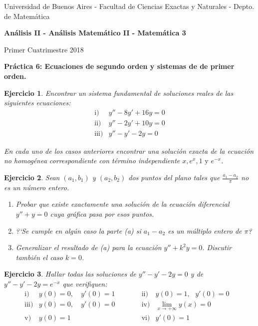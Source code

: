 \documentclass[11pt,a4paper,pdftex]{amsart}
\newtheorem{ej}{Ejercicio}%
\numberwithin{equation}{section}%
\newcommand{\bej}[1]{\begin{ej}\rm{#1}}
\newcommand{\eej}{\end{ej}\vspace{-0.2cm}}
\renewcommand{\bf}{\textbf}
\newcommand{\0}{\mathbb O}
\newcommand{\8}{\infty}
\begin{document}

\centerline{{\small Universidad de Buenos Aires - Facultad de Ciencias Exactas y Naturales - Depto. de Matemática}}

 \vskip 0.2cm
 \hrulefill
 \vskip 0.2cm

 \centerline{{\bf{\Large{\sc Análisis II - Análisis Matemático II - Matemática 3}}}}
 \vskip 0.2cm
 \centerline{\ttfamily Primer Cuatrimestre 2018}
 \hrulefill

 \medskip
 \centerline{\bf {Práctica 6: Ecuaciones de segundo orden y sistemas de de primer orden.}}
 \medskip

\setcounter{equation}{0}



\bej  Encontrar un sistema fundamental de soluciones reales de las siguientes
ecuaciones:
\[
\begin{array}{ll}
\mbox{i)}&y''-8y'+16y=0\\
\mbox{ii)}&y''-2y'+10y=0\\
\mbox{iii)}&y''-y'-2y=0
\end{array}
\]

 En cada uno de los casos anteriores encontrar una soluci\'on exacta
de la ecuaci\'on no homog\'enea correspondiente con t\'ermino
independiente $x, e^x,1 \mbox{ y } e^{-x}$.

\eej

\bej Sean $(a_{1},b_{1})$ y $(a_{2},b_{2})$ dos puntos del plano tales que
$\frac{a_{1}-a_{2}}{\pi}$ no es un n\'umero entero.
\begin{enumerate}
\item Probar que existe exactamente una soluci\'on de la ecuaci\'on
diferencial $y''+y=0$ cuya gr\'afica pasa por esos puntos.

\item ?`Se cumple en alg\'un caso la parte (a) si $a_{1}-a_{2}$ es un m\'ultiplo
entero de $\pi$?

\item Generalizar el resultado de (a) para la ecuaci\'on $y''+k^{2}y=0$. Discutir
tambi\'en el caso $k=0$.
\end{enumerate}
\eej

\bej Hallar todas las soluciones de $y''-y'-2y=0$ y de $y''-y'-2y= e^{-x}$
que verifiquen:
\[
\begin{array}{llllll}
\mbox{i)} &y(0)=0,\ &y'(0)=1\qquad\quad&\mbox{ii)}&y(0)=1,\ \ \ y'(0)=0\\
\mbox{iii)}&y(0)=0,&y'(0)=0&\mbox{iv)}&\lim_{x \rightarrow +\infty} y(x)=0&\\
\mbox{v)}&y(0)=1&&\mbox{vi)}&y'(0)=1&
\end{array}
\]
\eej
\end{document}
